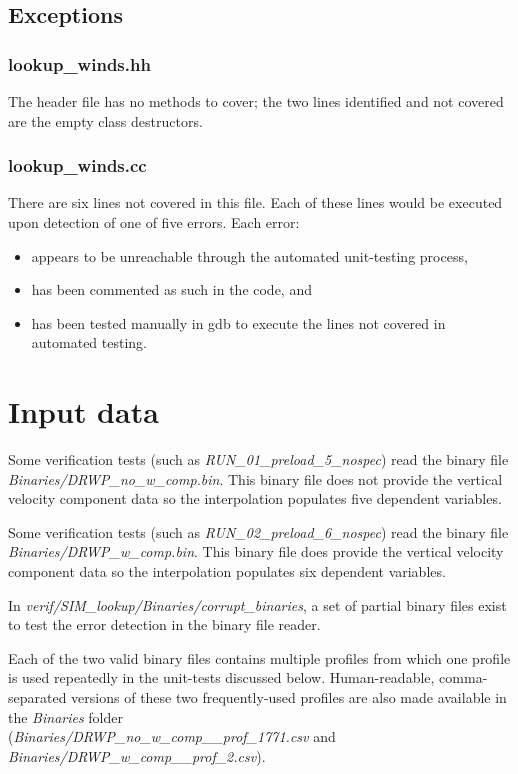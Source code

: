 \documentclass[11pt,fleqn]{report}
\begin{document}
\subsection{Exceptions}
\subsubsection{lookup\_winds.hh}
The header file has no methods to cover; the two lines identified and not
covered are the empty class destructors.

\subsubsection{lookup\_winds.cc}
There are six lines not covered in this file. Each of these lines would be 
executed upon detection of one of five errors. Each error:
\begin{itemize}
\item appears to be  unreachable through the automated unit-testing
process,
\item has been commented as such in the code, and
\item has been tested manually in gdb to execute the lines not covered in
automated testing.
\end{itemize}


\section{Input data}
Some verification tests (such as \textit{RUN\_01\_preload\_5\_nospec}) read
the binary file\\
\textit{Binaries/DRWP\_no\_w\_comp.bin}.
This binary file does not provide the vertical velocity component data so the
interpolation populates five dependent variables.

Some verification tests (such as \textit{RUN\_02\_preload\_6\_nospec}) read
the binary file\\
\textit{Binaries/DRWP\_w\_comp.bin}.
This binary file does provide the vertical velocity component data so the
interpolation populates six dependent variables.

In \textit{verif/SIM\_lookup/Binaries/corrupt\_binaries}, a set of partial
binary files exist to test the error detection in the binary file reader.

Each of the two valid binary files contains multiple profiles from which one
profile is used repeatedly in the unit-tests discussed below.
Human-readable, comma-separated versions of these two frequently-used
profiles are also made available in the \textit{Binaries} folder\\
(\textit{Binaries/DRWP\_no\_w\_comp\_\_prof\_1771.csv} and
\textit{Binaries/DRWP\_w\_comp\_\_prof\_2.csv}).
\end{document}
